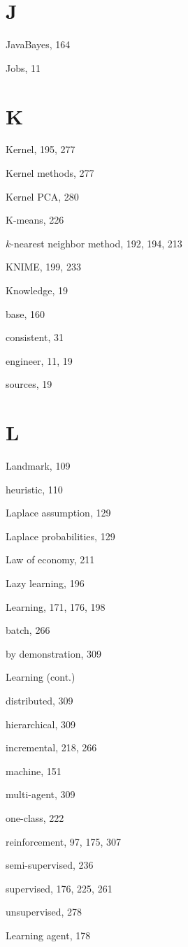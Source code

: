 \documentclass[10pt]{book}
\begin{document}
\section{J}

JavaBayes, 164

Jobs, 11

\section{K}

Kernel, 195, 277

Kernel methods, 277

Kernel PCA, 280

K-means, 226

$k$-nearest neighbor method, 192, 194, 213

KNIME, 199, 233

Knowledge, 19

base, 160

consistent, 31

engineer, 11, 19

sources, 19

\section{L}

Landmark, 109

heuristic, 110

Laplace assumption, 129

Laplace probabilities, 129

Law of economy, 211

Lazy learning, 196

Learning, 171, 176, 198

batch, 266

by demonstration, 309

Learning (cont.)

distributed, 309

hierarchical, 309

incremental, 218, 266

machine, 151

multi-agent, 309

one-class, 222

reinforcement, 97, 175, 307

semi-supervised, 236

supervised, 176, 225, 261

unsupervised, 278

Learning agent, 178
\end{document}

